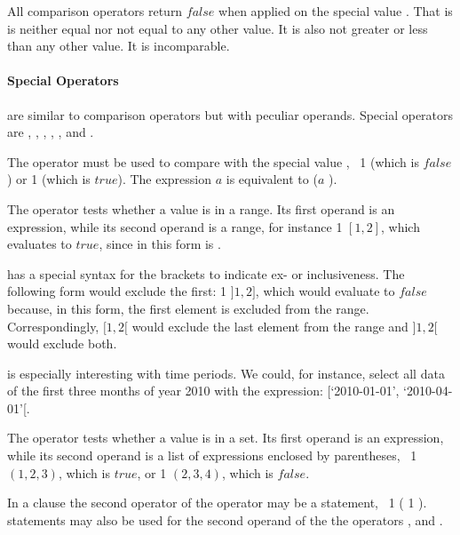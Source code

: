 All comparison operators return $false$
when applied on the special value .
That is  is neither equal nor
not equal to any other value. It is also
not greater or less than any other value.
It is incomparable. 

\paragraph{Special Operators}
are similar to comparison operators
but with peculiar operands.
Special operators are
,
,
,
,
,
 and
.


The operator  must be used
to compare with the special value
, \eg\ 1 
(which is $false$) 
or 1 
(which is $true$).
The expression
$a$  is
equivalent to
($a$ ).

The operator  tests
whether a value is in a range.
Its first operand is an expression,
while its second operand is a range,
for instance
1  $[1,2]$,
which evaluates to $true$,
since  in this form is
.

 has a special syntax
for the brackets to indicate
ex- or inclusiveness. The following
form would exclude the first:
1  $]1,2]$,
which would evaluate to $false$
because, in this form, the first
element is excluded from the range.
Correspondingly,
 $[1,2[$
would exclude the last element from the range
and
 $]1,2[$
would exclude both.

 is especially interesting
with time periods. We could, for instance,
select all data of the first three months
of year 2010 with the expression:
 
[`2010-01-01', `2010-04-01'[.

The operator  tests
whether a value is in a set.
Its first operand is an expression,
while its second operand is a list
of expressions enclosed by parentheses,
\eg\ 1  $(1,2,3)$,
which is $true$, or
1  $(2,3,4)$,
which is $false$.

In a  clause
the second operator of the  operator
may be a  statement, \eg\
1 
( 1  ).
\acronym{dql} statements may also be used
for the second operand of the the operators
,  and .

